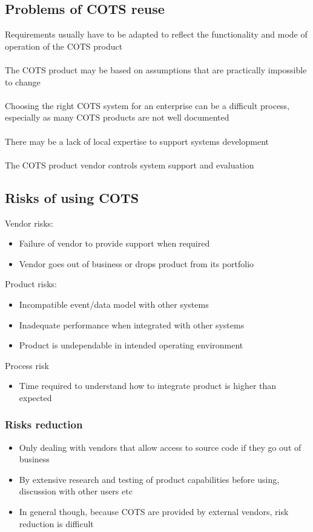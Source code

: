 \documentclass{article}[18pt]
\begin{document}
\subsection{Problems of COTS reuse}
Requirements usually have to be adapted to reflect the functionality and mode of operation of the COTS product\\
\\
The COTS product may be based on assumptions that are practically impossible to change\\
\\
Choosing the right COTS system for an enterprise can be a difficult process, especially as many COTS products are not well documented\\
\\
There may be a lack of local expertise to support systems development\\
\\
The COTS product vendor controls system support and evaluation
\subsection{Risks of using COTS}
Vendor risks:
\begin{itemize}
	\item Failure of vendor to provide support when required
	\item Vendor goes out of business or drops product from its portfolio
\end{itemize}
Product risks:
\begin{itemize}
	\item Incompatible event/data model with other systems
	\item Inadequate performance when integrated with other systems
	\item Product is undependable in intended operating environment
\end{itemize}
Process risk
\begin{itemize}
	\item Time required to understand how to integrate product is higher than expected
\end{itemize}
\subsubsection{Risks reduction}
\begin{itemize}
	\item Only dealing with vendors that allow access to source code if they go out of business
	\item By extensive research and testing of product capabilities before using, discussion with other users etc
	\item In general though, because COTS are provided by external vendors, risk reduction is difficult
\end{itemize}
\end{document}
